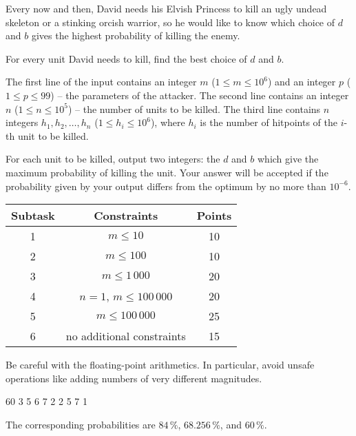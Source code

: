 Every now and then, David needs his Elvish Princess to kill an ugly undead skeleton or a stinking orcish warrior,
so he would like to know which choice of $d$ and $b$ gives the highest probability of killing the enemy.


For every unit David needs to kill, find the best choice of $d$ and $b$.


The first line of the input contains an integer $m$ ($1\leq m\leq 10^6$)
and an integer $p$ ($1\leq p\leq 99$) -- the parameters of the attacker.
The second line contains an integer $n$ ($1\leq n\leq 10^5$) -- the number of units to be killed.
The third line contains $n$ integers $h_1,h_2,\dots,h_n$ ($1\leq h_i\leq 10^6$),
where $h_i$ is the number of hitpoints of the $i$-th unit to be killed.



For each unit to be killed, output two integers: the $d$ and $b$ which give the maximum probability of killing the unit.
Your answer will be accepted if the probability given by your output differs from the optimum by no more than $10^{-6}$.


\begin{tabular}{|c|c|c|}
	\hline
	Subtask & Constraints  & Points \\
	\hline
	1 & $m \leq 10$ & 10 \\
	\hline
	2 & $m \leq 100$ & 10 \\
	\hline
	3 & $m \leq 1\,000$ & 20 \\
	\hline
	4 & $n=1$, $m\leq 100\,000$ & 20 \\
	\hline
	5 & $m \leq 100\,000$ & 25 \\
	\hline
	6 & no additional constraints & 15 \\
	\hline
\end{tabular}


Be careful with the floating-point arithmetics.
In particular, avoid unsafe operations like adding numbers of very different magnitudes.


 60
3
5 6 7
 2
2 5
7 1

\sampleEND

The corresponding probabilities are $84\,\%$, $68.256\,\%$, and $60\,\%$.


